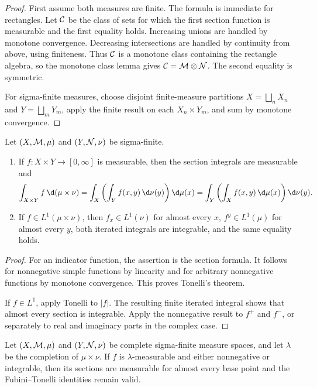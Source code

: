 \begin{proof}
First assume both measures are finite. The formula is immediate for rectangles. Let $\mathcal{C}$ be the class of sets for which the first section function is measurable and the first equality holds. Increasing unions are handled by monotone convergence. Decreasing intersections are handled by continuity from above, using finiteness. Thus $\mathcal{C}$ is a monotone class containing the rectangle algebra, so the monotone class lemma gives $\mathcal{C}=\mathcal{M}\otimes\mathcal{N}$. The second equality is symmetric.

For sigma-finite measures, choose disjoint finite-measure partitions $X=\bigsqcup_nX_n$ and $Y=\bigsqcup_mY_m$, apply the finite result on each $X_n\times Y_m$, and sum by monotone convergence.
\end{proof}

\begin{thm}
Let $(X,\mathcal{M},\mu)$ and $(Y,\mathcal{N},\nu)$ be sigma-finite.
\begin{enumerate}
  \item If $f:X\times Y\to[0,\infty]$ is measurable, then the section integrals are measurable and
  \[
  \int_{X\times Y}f\,\d(\mu\times\nu)
   =\int_X\left(\int_Yf(x,y)\,\d\nu(y)\right)\d\mu(x)
   =\int_Y\left(\int_Xf(x,y)\,\d\mu(x)\right)\d\nu(y).
  \]
  \item If $f\in L^1(\mu\times\nu)$, then $f_x\in L^1(\nu)$ for almost every $x$, $f^y\in L^1(\mu)$ for almost every $y$, both iterated integrals are integrable, and the same equality holds.
\end{enumerate}
\end{thm}

\begin{proof}
For an indicator function, the assertion is the section formula. It follows for nonnegative simple functions by linearity and for arbitrary nonnegative functions by monotone convergence. This proves Tonelli's theorem.

If $f\in L^1$, apply Tonelli to $|f|$. The resulting finite iterated integral shows that almost every section is integrable. Apply the nonnegative result to $f^+$ and $f^-$, or separately to real and imaginary parts in the complex case.
\end{proof}

\begin{thm}
Let $(X,\mathcal{M},\mu)$ and $(Y,\mathcal{N},\nu)$ be complete sigma-finite measure spaces, and let $\lambda$ be the completion of $\mu\times\nu$. If $f$ is $\lambda$-measurable and either nonnegative or integrable, then its sections are measurable for almost every base point and the Fubini--Tonelli identities remain valid.
\end{thm}

